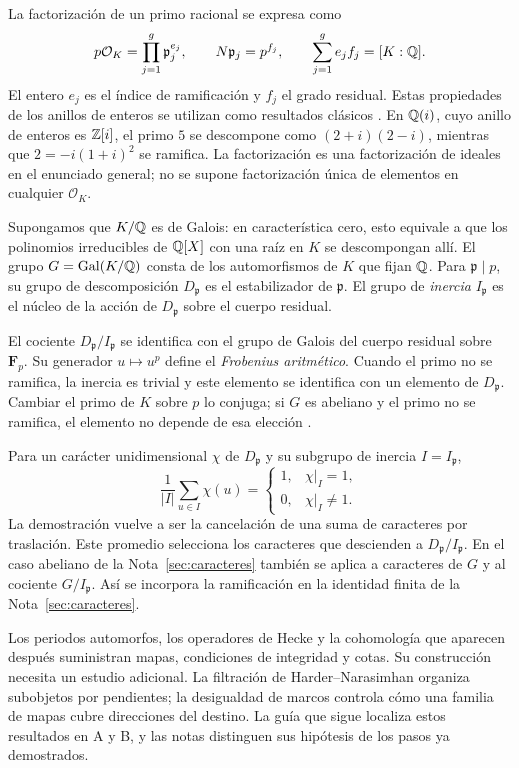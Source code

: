 La factorización de un primo racional se expresa como
\[
 p\mathcal O_K=\prod_{j=1}^g\mathfrak p_j^{e_j},\qquad
 N\mathfrak p_j=p^{f_j},\qquad
 \sum_{j=1}^g e_jf_j=[K:\mathbb{Q}].
\]
El entero $e_j$ es el índice de ramificación y $f_j$ el grado residual.
Estas propiedades de los anillos de enteros se utilizan como resultados
clásicos \cite{milne-ant}. En $\mathbb{Q}(i)$, cuyo anillo de enteros es
$\mathbb{Z}[i]$, el primo $5$ se descompone como $(2+i)(2-i)$, mientras que
$2=-i(1+i)^2$ se ramifica. La factorización es una factorización de
ideales en el enunciado general; no se supone factorización única de
elementos en cualquier $\mathcal O_K$.

Supongamos que $K/\mathbb{Q}$ es de Galois: en característica cero, esto equivale
a que los polinomios irreducibles de $\mathbb{Q}[X]$ con una raíz en $K$
se descompongan allí.
El grupo $G=\operatorname{Gal}(K/\mathbb{Q})$ consta de los automorfismos de $K$
que fijan $\mathbb{Q}$. Para $\mathfrak p\mid p$, su grupo de descomposición
$D_{\mathfrak p}$ es el estabilizador de $\mathfrak p$. El grupo de
\emph{inercia} $I_{\mathfrak p}$ es el núcleo de la acción de
$D_{\mathfrak p}$ sobre el cuerpo residual.

El cociente $D_{\mathfrak p}/I_{\mathfrak p}$ se identifica con el grupo
de Galois del cuerpo residual sobre $\mathbf F_p$. Su generador
$u\mapsto u^p$ define el \emph{Frobenius aritmético}. Cuando el primo
no se ramifica, la inercia es trivial y este elemento se identifica con
un elemento de $D_{\mathfrak p}$. Cambiar el primo de $K$ sobre $p$
lo conjuga; si $G$ es abeliano y el primo no se ramifica, el elemento
no depende de esa elección \cite[Lecture 7, §7.3]{sutherland-algebra}.

Para un carácter unidimensional $\chi$ de $D_{\mathfrak p}$ y su
subgrupo de inercia $I=I_{\mathfrak p}$,
\[
 \frac1{|I|}\sum_{u\in I}\chi(u)=
 \begin{cases}
  1,&\chi|_I=1,\\
  0,&\chi|_I\ne1.
 \end{cases}
\]
La demostración vuelve a ser la cancelación de una suma de caracteres
por traslación. Este promedio selecciona los caracteres que descienden
a $D_{\mathfrak p}/I_{\mathfrak p}$. En el caso abeliano de la
Nota~\ref{sec:caracteres} también se aplica a caracteres de $G$ y al
cociente $G/I_{\mathfrak p}$. Así se incorpora la ramificación en la
identidad finita de la Nota~\ref{sec:caracteres}.

Los periodos automorfos, los operadores de Hecke y la cohomología que
aparecen después suministran mapas, condiciones de integridad y cotas.
Su construcción necesita un estudio adicional. La filtración de
Harder--Narasimhan organiza subobjetos por pendientes; la desigualdad de
marcos controla cómo una familia de mapas cubre direcciones del destino.
La guía que sigue localiza estos resultados en A y B, y las notas
distinguen sus hipótesis de los pasos ya demostrados.

